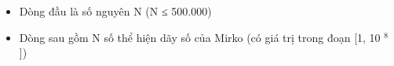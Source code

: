 \begin{itemize}
	\item     Dòng đầu là số nguyên N (N ≤ 500.000)   
	\item     Dòng sau gồm N số thể hiện dãy số của Mirko (có giá trị trong đoạn [1, 10    $^     8    $    ])    \textbf{}
\end{itemize}